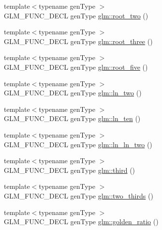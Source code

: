 \begin{DoxyCompactItemize}
\item 
{\footnotesize template$<$typename gen\-Type $>$ }\\G\-L\-M\-\_\-\-F\-U\-N\-C\-\_\-\-D\-E\-C\-L gen\-Type \hyperlink{group__gtc__constants_gab91b7799f88f9f2be33e385dec11b9c2}{glm\-::root\-\_\-two} ()
\item 
{\footnotesize template$<$typename gen\-Type $>$ }\\G\-L\-M\-\_\-\-F\-U\-N\-C\-\_\-\-D\-E\-C\-L gen\-Type \hyperlink{group__gtc__constants_gab3183635ac615473e2f95852f491be83}{glm\-::root\-\_\-three} ()
\item 
{\footnotesize template$<$typename gen\-Type $>$ }\\G\-L\-M\-\_\-\-F\-U\-N\-C\-\_\-\-D\-E\-C\-L gen\-Type \hyperlink{group__gtc__constants_gace2b8dfed1ab9fabbb67dde08e7e5b58}{glm\-::root\-\_\-five} ()
\item 
{\footnotesize template$<$typename gen\-Type $>$ }\\G\-L\-M\-\_\-\-F\-U\-N\-C\-\_\-\-D\-E\-C\-L gen\-Type \hyperlink{group__gtc__constants_ga22fae798430edc3022766af4fd83e8a4}{glm\-::ln\-\_\-two} ()
\item 
{\footnotesize template$<$typename gen\-Type $>$ }\\G\-L\-M\-\_\-\-F\-U\-N\-C\-\_\-\-D\-E\-C\-L gen\-Type \hyperlink{group__gtc__constants_ga48addf0cb0980277d208a71a1c59c073}{glm\-::ln\-\_\-ten} ()
\item 
{\footnotesize template$<$typename gen\-Type $>$ }\\G\-L\-M\-\_\-\-F\-U\-N\-C\-\_\-\-D\-E\-C\-L gen\-Type \hyperlink{group__gtc__constants_ga650774609debe4a90bcac449b574de2c}{glm\-::ln\-\_\-ln\-\_\-two} ()
\item 
{\footnotesize template$<$typename gen\-Type $>$ }\\G\-L\-M\-\_\-\-F\-U\-N\-C\-\_\-\-D\-E\-C\-L gen\-Type \hyperlink{group__gtc__constants_gabf280496105e0ad070287417f840ebd8}{glm\-::third} ()
\item 
{\footnotesize template$<$typename gen\-Type $>$ }\\G\-L\-M\-\_\-\-F\-U\-N\-C\-\_\-\-D\-E\-C\-L gen\-Type \hyperlink{group__gtc__constants_gadde7f2efce3b14c8b26944fbafed4a10}{glm\-::two\-\_\-thirds} ()
\item 
{\footnotesize template$<$typename gen\-Type $>$ }\\G\-L\-M\-\_\-\-F\-U\-N\-C\-\_\-\-D\-E\-C\-L gen\-Type \hyperlink{group__gtc__constants_gafd53093ef2d756333865d774bea3cdf9}{glm\-::golden\-\_\-ratio} ()
\end{DoxyCompactItemize}



